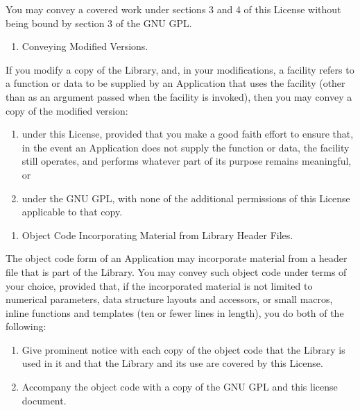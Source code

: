 You may convey a covered work under sections 3 and 4 of this License
without being bound by section 3 of the GNU GPL.

\begin{enumerate}
\def\labelenumi{\arabic{enumi}.}
\setcounter{enumi}{1}
\tightlist
\item
  Conveying Modified Versions.
\end{enumerate}

If you modify a copy of the Library, and, in your modifications, a
facility refers to a function or data to be supplied by an Application
that uses the facility (other than as an argument passed when the
facility is invoked), then you may convey a copy of the modified
version:

\begin{enumerate}
\def\labelenumi{\alph{enumi}.}
\item
  under this License, provided that you make a good faith effort to
  ensure that, in the event an Application does not supply the function
  or data, the facility still operates, and performs whatever part of
  its purpose remains meaningful, or
\item
  under the GNU GPL, with none of the additional permissions of this
  License applicable to that copy.
\end{enumerate}

\begin{enumerate}
\def\labelenumi{\arabic{enumi}.}
\setcounter{enumi}{2}
\tightlist
\item
  Object Code Incorporating Material from Library Header Files.
\end{enumerate}

The object code form of an Application may incorporate material from a
header file that is part of the Library. You may convey such object code
under terms of your choice, provided that, if the incorporated material
is not limited to numerical parameters, data structure layouts and
accessors, or small macros, inline functions and templates (ten or fewer
lines in length), you do both of the following:

\begin{enumerate}
\def\labelenumi{\alph{enumi}.}
\item
  Give prominent notice with each copy of the object code that the
  Library is used in it and that the Library and its use are covered by
  this License.
\item
  Accompany the object code with a copy of the GNU GPL and this license
  document.
\end{enumerate}

